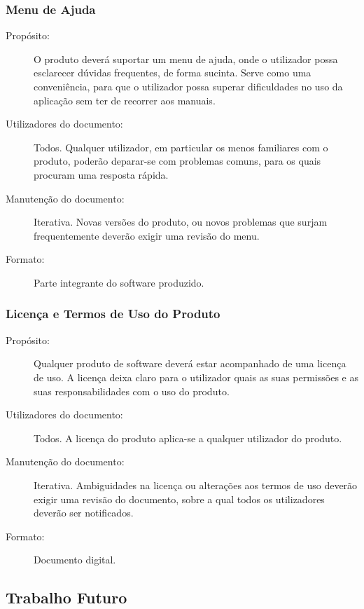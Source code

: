 \documentclass{article}
\begin{document}
    \subsubsection{Menu de Ajuda}
      \begin{description}
        \item[Propósito:]O produto deverá suportar um menu de ajuda, onde o utilizador possa esclarecer dúvidas frequentes, de forma sucinta. Serve como uma conveniência, para que o utilizador possa superar dificuldades no uso da aplicação sem ter de recorrer aos manuais.

        \item[Utilizadores do documento:]Todos. Qualquer utilizador, em particular os menos familiares com o produto, poderão deparar-se com problemas comuns, para os quais procuram uma resposta rápida.
        \item[Manutenção do documento:]Iterativa. Novas versões do produto, ou novos problemas que surjam frequentemente deverão exigir uma revisão do menu.
        \item[Formato:]Parte integrante do software produzido.
      \end{description}

    \subsubsection{Licença e Termos de Uso do Produto}
      \begin{description}
        \item[Propósito:]Qualquer produto de software deverá estar acompanhado de uma licença de uso. A licença deixa claro para o utilizador quais as suas permissões e as suas responsabilidades com o uso do produto.
        \item[Utilizadores do documento:]Todos. A licença do produto aplica-se a qualquer utilizador do produto.
        \item[Manutenção do documento:]Iterativa. Ambiguidades na licença ou alterações aos termos de uso deverão exigir uma revisão do documento, sobre a qual todos os utilizadores deverão ser notificados.
        \item[Formato:]Documento digital.
      \end{description}

  \subsection{Trabalho Futuro}
\end{document}

